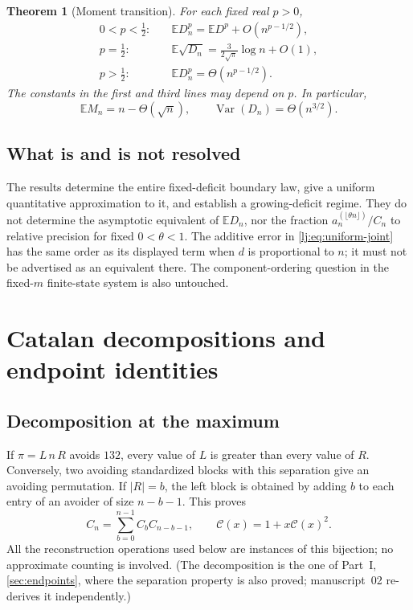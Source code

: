 \documentclass[11pt,a4paper]{article}
\newtheorem{theorem}{Theorem}[section]
\theoremstyle{definition}\newaliascnt{definition}{theorem}
\theoremstyle{remark}\newaliascnt{remark}{theorem}
\newcommand{\Cat}{\mathcal C}
\newcommand{\ljE}{\mathbb E}
\begin{document}
\begin{theorem}[Moment transition]\label{lj:thm:moments-main}
For each fixed real $p>0$,
\begin{align}
 0<p<\tfrac12:\quad
 &\ljE D_n^p=\ljE D^p+O(n^{p-1/2}),\label{lj:eq:small-moments}\\
 p=\tfrac12:\quad
 &\ljE\sqrt{D_n}=\frac{3}{2\sqrt\pi}\log n+O(1),
 \label{lj:eq:critical-moment}\\
 p>\tfrac12:\quad
 &\ljE D_n^p=\Theta(n^{p-1/2}).\label{lj:eq:large-moments}
\end{align}
The constants in the first and third lines may depend on $p$.
In particular,
\begin{equation}
 \ljE M_n=n-\Theta(\sqrt n),\qquad
 \operatorname{Var}(D_n)=\Theta(n^{3/2}).
 \label{lj:eq:mean-variance}
\end{equation}
\end{theorem}

\subsection{What is and is not resolved}
The results determine the entire fixed-deficit boundary law, give a
uniform quantitative approximation to it, and establish a growing-deficit
regime. They do not determine the asymptotic equivalent of
$\ljE D_n$, nor the fraction $a_n^{(\lfloor\theta n\rfloor)}/C_n$ to
relative precision for fixed $0<\theta<1$. The additive error in
\eqref{lj:eq:uniform-joint} has the same order as its displayed term when
$d$ is proportional to $n$; it must not be advertised as an equivalent
there. The component-ordering question in the fixed-$m$ finite-state
system is also untouched.

\section{Catalan decompositions and endpoint identities}
\label{lj:sec:preliminaries}

\subsection{Decomposition at the maximum}
If $\pi=L\,n\,R$ avoids $132$, every value of $L$ is greater than every
value of $R$. Conversely, two avoiding standardized blocks with this
separation give an avoiding permutation. If $|R|=b$, the left block is
obtained by adding $b$ to each entry of an avoider of size $n-b-1$.
This proves
\[
 C_n=\sum_{b=0}^{n-1}C_bC_{n-b-1},\qquad
 \Cat(x)=1+x\Cat(x)^2.
\]
All the reconstruction operations used below are instances of this
bijection; no approximate counting is involved. (The decomposition is the
one of Part~I, \cref{sec:endpoints}, where the separation property is also
proved; manuscript~02 re-derives it independently.)
\end{document}
